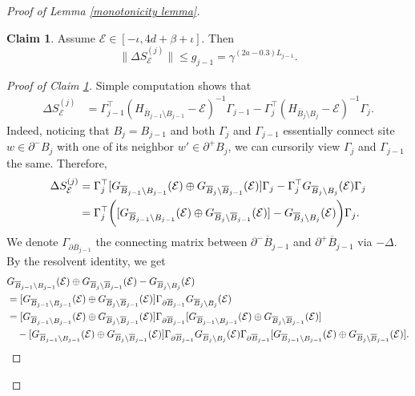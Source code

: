 \documentclass[11pt,reqno,UTF8,twoside]{amsart}
\newcommand{\mcE}{\mathcal{E}}
\newcommand{\barB}{\overline{B}}
\newcommand{\diffSj}{\Delta {S}^{(j)}}
\theoremstyle{definition}
\newtheorem{claim}[thm]{\bf Claim}
\numberwithin{equation}{section}
\begin{document}
\begin{proof}[Proof of Lemma \ref{monotonicity lemma}]
\begin{claim}\label{estimate on difference in scales}
    Assume $\mcE\in [-\iota,4d+\beta+\iota]$. Then 
  \[ \| \diffSj_\mcE  \| \leq g_{j-1}=\gamma^{(2a-0.3)L_{j-1}}.\]
\end{claim}
\begin{proof}[Proof of Claim \ref{estimate on difference in scales}]
  Simple computation shows that 
  \begin{align*}
    \diffSj_\mcE &= \Gamma_{j-1}^{\top}(H_{\barB_{j-1}\setminus B_{j-1}}-\mcE)^{-1}\Gamma_{j-1}-\Gamma_j^{\top}(H_{\barB_j\setminus B_j}-\mcE)^{-1}\Gamma_j. 
  \end{align*}
  Indeed, noticing that $B_j=B_{j-1}$ and both $\Gamma_j$ and $\Gamma_{j-1}$ essentially connect site $w \in \partial^-B_j$ with one of its neighbor $w'\in \partial^+ B_j$, we can cursorily view $\Gamma_j$ and $\Gamma_{j-1}$ the same. Therefore,
 \begin{align}\label{sandwich 1}
  \notag  \diffSj_\mcE &= \Gamma_{j}^{\top}[ G_{\barB_{j-1}\setminus B_{j-1}}(\mcE)\oplus G_{\barB_{j}\setminus \barB_{j-1}}(\mcE) ]\Gamma_{j}-\Gamma_j^{\top}G_{\barB_j\setminus B_j}(\mcE)\Gamma_j \\
         &= \Gamma_{j}^{\top} \bigg( [ G_{\barB_{j-1}\setminus B_{j-1}}(\mcE)\oplus G_{\barB_{j}\setminus \barB_{j-1}}(\mcE) ]-G_{\barB_j\setminus B_j}(\mcE) \bigg) \Gamma_j .
  \end{align}
  We denote $\Gamma_{\partial \barB_{j-1}}$ the connecting matrix between $\partial^-\barB_{j-1}$ and $\partial^+\barB_{j-1}$ via $-\Delta$.
  By the  resolvent  identity, we get 
  {\small
  \begin{align}\label{vanish term}
    \notag &G_{\barB_{j-1}\setminus B_{j-1}}(\mcE)  \oplus G_{\barB_{j}\setminus \barB_{j-1}}(\mcE) -G_{\barB_j\setminus B_j}(\mcE) \\
   \notag  &  =  [G_{\barB_{j-1}\setminus B_{j-1}}(\mcE) \oplus G_{\barB_{j}\setminus \barB_{j-1}}(\mcE) ] \Gamma_{\partial \barB_{j-1}}G_{\barB_j\setminus B_j}(\mcE)  \\
         & =[G_{\barB_{j-1}\setminus B_{j-1}}(\mcE) \oplus G_{\barB_{j}\setminus \barB_{j-1}}(\mcE) ] \Gamma_{\partial \barB_{j-1}}[G_{\barB_{j-1}\setminus B_{j-1}}(\mcE) \oplus G_{\barB_{j}\setminus \barB_{j-1}}(\mcE) ] \\
     \notag    & \quad  -[G_{\barB_{j-1}\setminus B_{j-1}}(\mcE) \oplus G_{\barB_{j}\setminus \barB_{j-1}}(\mcE) ] \Gamma_{\partial \barB_{j-1}} G_{\barB_j\setminus B_j}(\mcE)  \Gamma_{\partial \barB_{j-1}}[G_{\barB_{j-1}\setminus B_{j-1}}(\mcE) \oplus G_{\barB_{j}\setminus \barB_{j-1}}(\mcE) ].

\end{align}}
\end{proof}
\end{proof}
\end{document}
